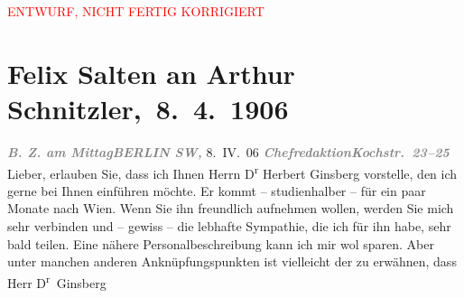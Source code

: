 
\begin{center}
            \textcolor{red}{ENTWURF, NICHT FERTIG KORRIGIERT}
                      \end{center}
            
         
         \renewcommand{\erwaehntePersonen}{Personen: Herbert Ginsberg, Ottilie Salten, Olga Schnitzler}
         \renewcommand{\erwaehnteInstitutionen}{Institutionen: B.Z. am Mittag}
         \renewcommand{\erwaehnteOrte}{Orte: Berlin, Griechenland, Kairo, Kochstraße, Wien}
         \renewcommand{\erwaehnteWerke}{}
               \section[ Felix Salten an Arthur Schnitzler, 8. 4. 1906]{ Felix Salten an Arthur Schnitzler, 8. 4. 1906}\nopagebreak{}\rehead{ }\begin{ledgroupsized}[t]{13cm}\normalsize\beginnumbering \toendnotes[C]{\smallbreak\pagebreak[2]} 
\toendnotes[C]{\smallbreak}\pstart
           \noindent{}{\pb}\textcolor{gray}{\textbf{\emph{B. Z. am Mittag}}}\hfill \textcolor{gray}{\textbf{\emph{BERLIN SW,}}}{ }8. IV. 06\pend
           \pstart
           \textcolor{gray}{\textbf{\emph{Chefredaktion}}}\hfill \textcolor{gray}{\textbf{\emph{Kochstr. 23–25}}}\pend
           \pstart
           Lieber, erlauben Sie, dass ich Ihnen Herrn D\textsuperscript{r}{ }Herbert Ginsberg vorstelle, den ich gerne bei
               Ihnen einführen möchte. Er kommt – studienhalber – für ein paar Monate nach Wien. Wenn Sie ihn freundlich aufnehmen wollen,
               werden Sie mich sehr verbinden und – gewiss – die lebhafte Sympathie, die ich für ihn
               habe, sehr bald teilen. Eine nähere Personalbeschreibung kann ich mir wol sparen.
               Aber unter manchen anderen Anknüpfungspunkten ist vielleicht der zu erwähnen, dass
               Herr D\textsuperscript{r} Ginsberg

\end{ledgroupsized}
